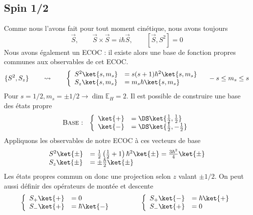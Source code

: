 	\subsection{Spin 1/2}
	Comme nous l'avons fait pour tout moment cinétique, nous avons toujours
	\begin{equation}	
	\vec{S},\qquad \vec{S}\times\vec{S} = i\hbar\vec{S},\qquad [\vec{S},S^2]=0
	\end{equation}
	Nous avons également un ECOC : il existe alors une base de fonction propres communes 
	aux observables de cet ECOC.
	\begin{equation}
	\{S^2,S_z\}\qquad \rightsquigarrow\qquad \left\{\begin{array}{ll}
	S^2\ket{s,m_s} &= s(s+1)\hbar^2 \ket{s,m_s}\\
	S_z\ket{s,m_s} &= m_s\hbar \ket{s,m_s}	
	\end{array}\right.\quad -s\leq m_s\leq s
	\end{equation}
	Pour $s=1/2, m_s = \pm 1/2 \rightarrow \dim\mathbb{E}_H = 2$. Il est possible de construire 
	une base des états propre
	\begin{equation}
	\text{\textsc{Base} : }\ \left\{\begin{array}{ll}
	\ket{+} &=\DS \ket{\frac{1}{2},\frac{1}{2}}\\
	\ket{-} &=\DS \ket{\frac{1}{2},-\frac{1}{2}}	
	\end{array}\right.
	\end{equation}
	Appliquons les observables de notre ECOC à ces vecteurs de base
	\begin{equation}
	\begin{array}{ll}
	S^2\ket{\pm} &= \frac{1}{2}\left(\frac{1}{2}+1\right)\hbar^2\ket{\pm} = \frac{3\hbar^2}{4}\ket{\pm}\\
	S_z\ket{\pm} &= \pm\frac{\hbar}{2}\ket{\pm}
	\end{array} 
	\end{equation}
	Les états propres commun on donc une projection selon $z$ valant $\pm 1/2$.
	On peut aussi définir des opérateurs de montée et descente
	\begin{equation}
	\left\{\begin{array}{ll}
	S_+\ket{+} &= 0\\
	S_-\ket{+} &= \hbar\ket{-}
	\end{array}\right.\qquad\qquad\left\{\begin{array}{ll}
	S_+\ket{-} &= \hbar\ket{+}\\
	S_-\ket{+} &= 0
	\end{array}\right.
	\end{equation}

